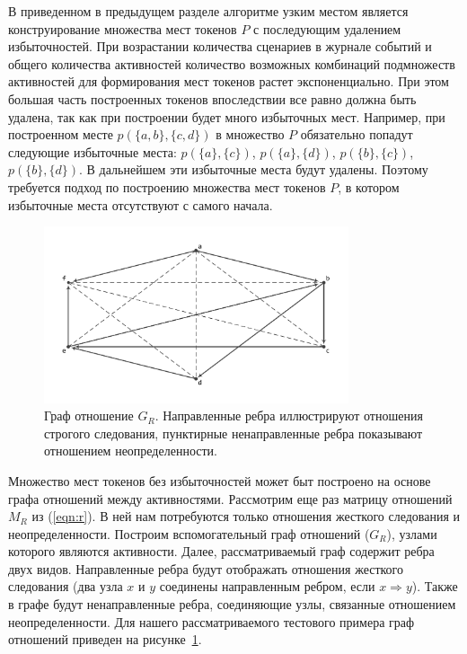 \documentclass[
11pt,%
tightenlines,%
twoside,%
onecolumn,%
nofloats,%
nobibnotes,%
nofootinbib,%
superscriptaddress,%
noshowpacs,%
centertags]%
{revtex4}
\begin{document}
В приведенном в предыдущем разделе алгоритме узким местом является конструирование множества мест токенов $P$ с последующим удалением избыточностей.
При возрастании количества сценариев в журнале событий и общего количества активностей количество возможных комбинаций подмножеств активностей для формирования мест токенов растет экспоненциально.
При этом большая часть построенных токенов впоследствии все равно должна быть удалена, так как при построении будет много избыточных мест.
Например, при построенном месте $p(\{a, b\}, \{c, d\})$ в множество $P$ обязательно попадут следующие избыточные места: $p(\{a\}, \{c\})$, $p(\{a\}, \{d\})$, $p(\{b\}, \{c\})$, $p(\{b\}, \{d\})$.
В дальнейшем эти избыточные места будут удалены.
Поэтому требуется подход по построению множества мест токенов $P$, в котором избыточные места отсутствуют с самого начала.

\begin{figure}[h]
\setcaptionmargin{5mm}
\includegraphics[width=0.8\textwidth]{pics/g_r.pdf}
\caption{Граф отношение $G_R$. Направленные ребра иллюстрируют отношения строгого следования, пунктирные ненаправленные ребра показывают отношением неопределенности.}
\label{fig:g_r}
\end{figure}

Множество мест токенов без избыточностей может быт построено на основе графа отношений между активностями.
Рассмотрим еще раз матрицу отношений $M_R$ из (\ref{eqn:r}).
В ней нам потребуются только отношения жесткого следования и неопределенности.
Построим вспомогательный граф отношений ($G_R$), узлами которого являются активности.
Далее, рассматриваемый граф содержит ребра двух видов.
Направленные ребра будут отображать отношения жесткого следования (два узла $x$ и $y$ соединены направленным ребром, если $x \Rightarrow y$).
Также в графе будут ненаправленные ребра, соединяющие узлы, связанные отношением неопределенности.
Для нашего рассматриваемого тестового примера граф отношений приведен на рисунке~\ref{fig:g_r}.
\end{document}
